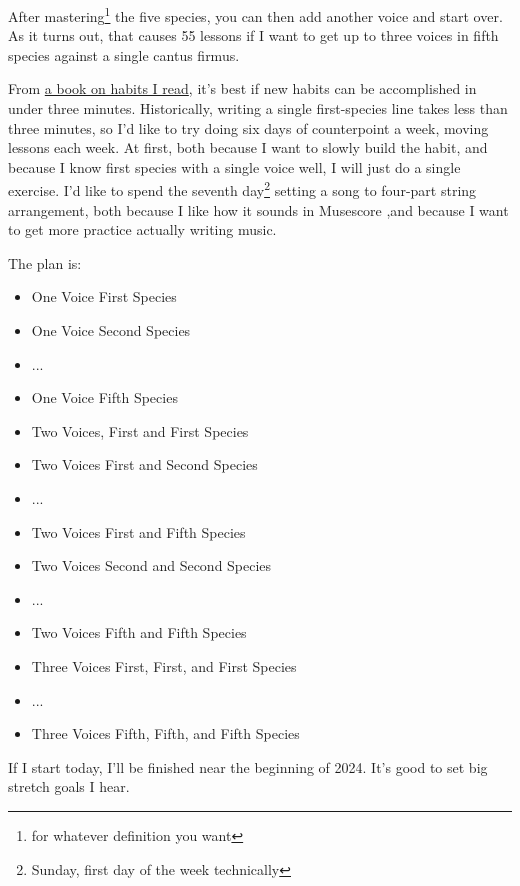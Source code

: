 \documentclass[12pt]{article}[titlepage]
\newcommand{\1}{\={a}}
\newcommand{\2}{\={e}}
\newcommand{\3}{\={\i}}
\newcommand{\4}{\=o}
\newcommand{\5}{\=u}
\newcommand{\6}{\={A}}
\renewcommand{\,}{\textsuperscript{,}}
\begin{document}
After mastering\footnote{for whatever definition you want} the five species, you can then add another voice and start over.
As it turns out, that causes 55 lessons if I want to get up to three voices in fifth species against a single cantus firmus.

From \href{book-review-atomic-habits.html}{a book on habits I read}, it's best if new habits can be accomplished in under three minutes.
Historically, writing a single first-species line takes less than three minutes, so I'd like to try doing six days of counterpoint a week, moving lessons each week.
At first, both because I want to slowly build the habit, and because I know first species with a single voice well, I will just do a single exercise.
I'd like to spend the seventh day\footnote{Sunday, first day of the week technically} setting a song to four-part string arrangement, both because I like how it sounds in Musescore ,and because I want to get more practice actually writing music.

The plan is:
\begin{itemize}
\item One Voice First Species
\item One Voice Second Species
\item ...
\item One Voice Fifth Species
\item Two Voices, First and First Species
\item Two Voices First and Second Species
\item ...
\item Two Voices First and Fifth Species
\item Two Voices Second and Second Species
\item ...
\item Two Voices Fifth and Fifth Species
\item Three Voices First, First, and First Species
\item ...
\item Three Voices Fifth, Fifth, and Fifth Species
\end{itemize}
If I start today, I'll be finished near the beginning of 2024.
It's good to set big stretch goals I hear.
\end{document}
